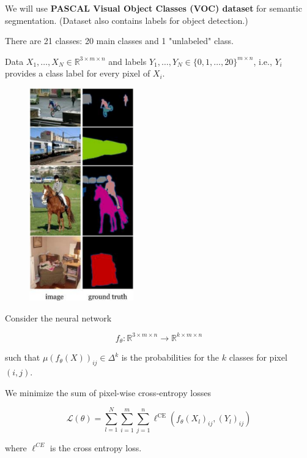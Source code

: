 \documentclass{report}
\begin{document}
\begin{definition}
    We will use \textbf{PASCAL Visual Object Classes (VOC) dataset} for semantic segmentation.
    (Dataset also contains labels for object detection.)

    There are 21 classes: 20 main classes and 1 "unlabeled" class.

    Data $X_{1}, \ldots, X_{N} \in \mathbb{R}^{3 \times m \times n}$ and labels $Y_{1}, \ldots, Y_{N} \in\{0,1, \ldots, 20\}^{m \times n}$, i.e., $Y_{i}$ provides a class label for every pixel of $X_{i}$.

    \begin{figure}[H]
        \centering
        \includegraphics[width=0.4\textwidth]{.././assets/8.24.png}
    \end{figure}
\end{definition}

\begin{concept}
    Consider the neural network

    $$
    f_{\theta}: \mathbb{R}^{3 \times m \times n} \rightarrow \mathbb{R}^{k \times m \times n}
    $$

    such that $\mu\left(f_{\theta}(X)\right)_{i j} \in \Delta^{k}$ is the probabilities for the $k$ classes for pixel $(i, j)$.

    We minimize the sum of pixel-wise cross-entropy losses

    $$
    \mathcal{L}(\theta)=\sum_{l=1}^{N} \sum_{i=1}^{m} \sum_{j=1}^{n} \ell^{\mathrm{CE}}\left(f_{\theta}\left(X_{l}\right)_{i j},\left(Y_{l}\right)_{i j}\right)
    $$

    where $\ell^{C E}$ is the cross entropy loss.
\end{concept}
\end{document}
